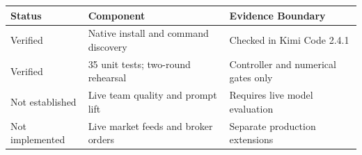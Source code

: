 \begin{tabular}{@{}P{3.0cm}P{4.6cm}P{4.9cm}@{}}
\toprule
\textbf{Status} & \textbf{Component} & \textbf{Evidence Boundary} \\
\midrule
Verified & Native install and command discovery & Checked in Kimi Code 2.4.1 \\
Verified & 35 unit tests; two-round rehearsal & Controller and numerical gates only \\
Not established & Live team quality and prompt lift & Requires live model evaluation \\
Not implemented & Live market feeds and broker orders & Separate production extensions \\
\bottomrule
\end{tabular}
